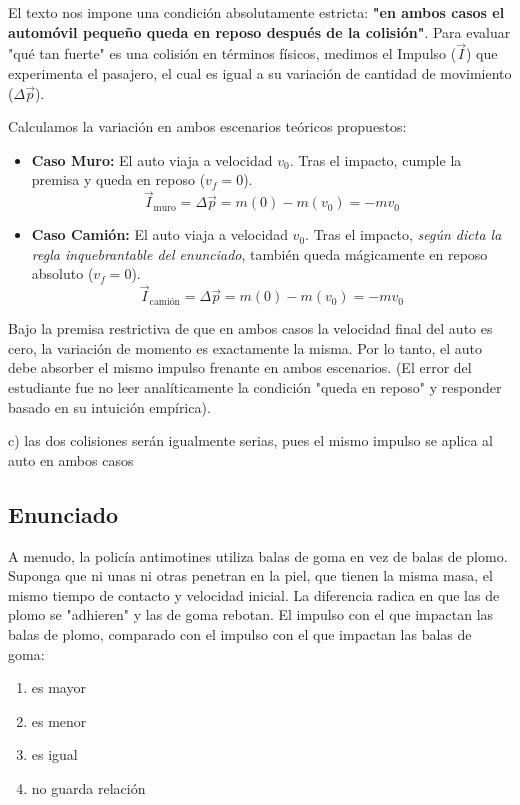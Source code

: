 \documentclass[12pt, a4paper]{article}
\begin{document}
El texto nos impone una condición absolutamente estricta: \textbf{"en ambos casos el automóvil pequeño queda en reposo después de la colisión"}.
Para evaluar "qué tan fuerte" es una colisión en términos físicos, medimos el Impulso ($\vec{I}$) que experimenta el pasajero, el cual es igual a su variación de cantidad de movimiento ($\Delta\vec{p}$).

Calculamos la variación en ambos escenarios teóricos propuestos:
\begin{itemize}
    \item \textbf{Caso Muro:} El auto viaja a velocidad $v_0$. Tras el impacto, cumple la premisa y queda en reposo ($v_f = 0$). 
    $$ \vec{I}_{\text{muro}} = \Delta\vec{p} = m(0) - m(v_0) = -mv_0 $$
    \item \textbf{Caso Camión:} El auto viaja a velocidad $v_0$. Tras el impacto, \textit{según dicta la regla inquebrantable del enunciado}, también queda mágicamente en reposo absoluto ($v_f = 0$).
    $$ \vec{I}_{\text{camión}} = \Delta\vec{p} = m(0) - m(v_0) = -mv_0 $$
\end{itemize}

Bajo la premisa restrictiva de que en ambos casos la velocidad final del auto es cero, la variación de momento es exactamente la misma. Por lo tanto, el auto debe absorber el mismo impulso frenante en ambos escenarios. (El error del estudiante fue no leer analíticamente la condición "queda en reposo" y responder basado en su intuición empírica).

\begin{tcolorbox}[colback=green!5!white, colframe=green!50!black, title=Respuesta Final]
\centering \Large c) las dos colisiones serán igualmente serias, pues el mismo impulso se aplica al auto en ambos casos
\end{tcolorbox}

\newpage

\subsection*{Enunciado}
A menudo, la policía antimotines utiliza balas de goma en vez de balas de plomo. Suponga que ni unas ni otras penetran en la piel, que tienen la misma masa, el mismo tiempo de contacto y velocidad inicial. La diferencia radica en que las de plomo se "adhieren" y las de goma rebotan. El impulso con el que impactan las balas de plomo, comparado con el impulso con el que impactan las balas de goma:
\begin{enumerate}[label=\alph*)]
    \item es mayor
    \item es menor
    \item es igual
    \item no guarda relación
\end{enumerate}
\end{document}
